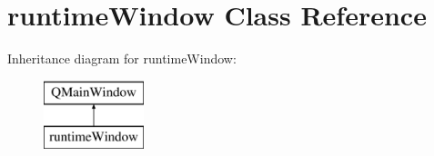 \hypertarget{classruntime_window}{}\section{runtime\+Window Class Reference}
\label{classruntime_window}
Inheritance diagram for runtime\+Window\+:\begin{figure}[H]
\begin{center}
\leavevmode
\includegraphics[height=2.000000cm]{classruntime_window}
\end{center}
\end{figure}
